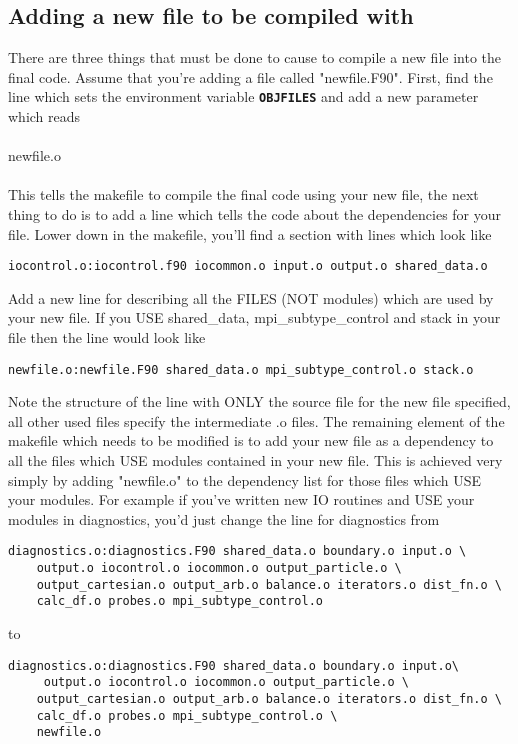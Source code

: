 \documentclass[12pt,a4paper]{article}
\newcommand{\simpleboxverbatim}{\begin{Verbatim}[obeytabs=true,frame=single,
  framerule=0.5mm,rulecolor=\color{warwickmid},formatcom=\color{black}]}
\newcommand{\inlinecode}[1]{{\color{warwickred} \bf\texttt{#1}}}
\newcommand{\EPOCH}{{\color{warwickdark}\fontfamily{phv}\selectfont{EPOCH}}}
\begin{document}
\subsection{Adding a new file to be compiled with {\EPOCH}}
There are three things that must be done to cause {\EPOCH} to compile a new file
into the final code. Assume that you're adding a file called
"newfile.F90". First, find the line which sets the environment variable
\inlinecode{OBJFILES} and add a new parameter which reads\\
\\
newfile.o\\
\\ This tells the makefile to compile the final code using your new file, the
next thing to do is to add a line which tells the code about the dependencies
for your file. Lower down in the makefile, you'll find a section with lines
which look like
\simpleboxverbatim
iocontrol.o:iocontrol.f90 iocommon.o input.o output.o shared_data.o
\end{Verbatim}
Add a new line for describing all the FILES (NOT modules) which are used by
your new file. If you USE shared\_data, mpi\_subtype\_control and stack in
your file then the line would look like
\simpleboxverbatim
newfile.o:newfile.F90 shared_data.o mpi_subtype_control.o stack.o
\end{Verbatim}
Note the structure of the line with ONLY the source file for the new file
specified, all other used files specify the intermediate .o files. The
remaining element of the makefile which needs to be modified is to add your
new file as a dependency to all the files which USE modules contained in your
new file. This is achieved very simply by adding "newfile.o" to the dependency
list for those files which USE your modules. For example if you've written new
IO routines and USE your modules in diagnostics, you'd just change the line
for diagnostics from

\simpleboxverbatim
diagnostics.o:diagnostics.F90 shared_data.o boundary.o input.o \
	output.o iocontrol.o iocommon.o output_particle.o \
	output_cartesian.o output_arb.o balance.o iterators.o dist_fn.o \
	calc_df.o probes.o mpi_subtype_control.o
\end{Verbatim}
to
\simpleboxverbatim
diagnostics.o:diagnostics.F90 shared_data.o boundary.o input.o\
	 output.o iocontrol.o iocommon.o output_particle.o \
	output_cartesian.o output_arb.o balance.o iterators.o dist_fn.o \
	calc_df.o probes.o mpi_subtype_control.o \
	newfile.o
\end{Verbatim}
\end{document}
